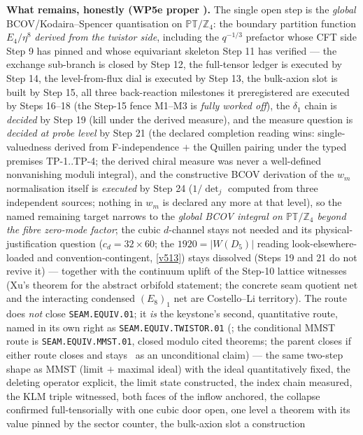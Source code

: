 \documentclass[11pt,a4paper]{article}
\newcommand{\Z}{\mathbb{Z}}
\theoremstyle{definition}
\begin{document}
\par\smallskip\noindent\textbf{What remains, honestly (WP5e proper \mO).}
The single open step is the \emph{global} BCOV/Kodaira--Spencer quantisation on $\mathbb{PT}/\Z_4$:
the boundary partition function $E_4/\eta^8$ \emph{derived from the twistor side}, including the
$q^{-1/3}$ prefactor whose CFT side Step 9 has pinned and whose equivariant skeleton Step 11 has
verified --- the exchange sub-branch is closed by Step 12, the full-tensor ledger is executed by
Step 14, the level-from-flux dial is executed
by Step 13, the bulk-axion slot is built by Step 15, all three back-reaction milestones it
preregistered are executed by Steps 16--18 (the Step-15 fence M1--M3 is \emph{fully worked
off}), the $\delta_1$ chain is \emph{decided} by Step 19 (kill under the derived measure),
and the measure question is \emph{decided at probe level} by Step 21 (the declared completion
reading wins: single-valuedness derived from F-independence $+$ the Quillen pairing under the
typed premises TP-1..TP-4; the derived chiral measure was never a well-defined nonvanishing
moduli integral), and the constructive BCOV derivation of the $w_m$ normalisation itself is
\emph{executed} by Step 24 ($1/\det_j$ computed from three independent sources; nothing in
$w_m$ is declared any more at that level), so the named remaining target narrows to the
\emph{global BCOV integral on $\mathbb{PT}/\Z_4$ beyond the fibre zero-mode factor};
the cubic $d$-channel stays not needed
and its physical-justification question ($c_d=32\times60$; the
$1920=|W(D_5)|$ reading look-elsewhere-loaded and convention-contingent, \vref{v513}) stays
dissolved (Steps 19 and 21 do not revive it) --- together with the
continuum uplift of the Step-10 lattice witnesses (Xu's theorem for the abstract orbifold
statement; the concrete seam quotient net and the interacting condensed $(E_8)_1$ net are
Costello--Li territory). The route does \emph{not} close \texttt{SEAM.EQUIV.01}; it \emph{is} the
keystone's second, quantitative route, named in its own right as \texttt{SEAM.EQUIV.TWISTOR.01}
(\mO; the conditional MMST route is \texttt{SEAM.EQUIV.MMST.01}, closed modulo cited theorems; the
parent closes if either route closes and stays \mO\ as an unconditional claim) --- the same
two-step shape as MMST (limit $+$ maximal
ideal) with the ideal quantitatively fixed, the deleting operator explicit, the limit state
constructed, the index chain measured, the KLM triple witnessed, both faces of the inflow
anchored, the collapse confirmed full-tensorially with one cubic door open, one level a
theorem with its value pinned by the sector counter, the bulk-axion slot a construction
\end{document}
